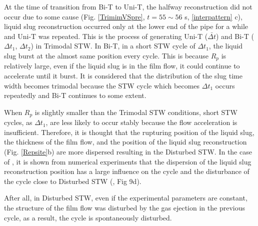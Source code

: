\documentclass[aps,pre,preprint,groupedaddress,showkeys]{revtex4-2}
\begin{document}
At the time of transition from Bi-T to Uni-T, the halfway reconstruction did not occur due to some cause (Fig. \ref{TrimimVSpre}, $ t = 55 \sim56 $ s, \ref{interpattern} c), liquid slug reconstruction occurred only at the lower end of the pipe for a while and Uni-T was repeated.
This is the process of generating Uni-T ($ \bar{\Delta t} $) and Bi-T ($ \Delta t_ {1} $, $ \Delta t_ {2} $) in Trimodal STW.
In Bi-T, in a short STW cycle of $ \Delta t_ {1} $, the liquid slug burst at the almost same position every cycle.
This is because $ R_p $ is relatively large, even if the liquid slug is in the film flow, it could continue to accelerate until it burst.
It is considered that the distribution of the slug time width becomes trimodal because the STW cycle which becomes $ \Delta t_ {1} $ occurs repeatedly and Bi-T continues to some extent.

When $ R_p $ is slightly smaller than the Trimodal STW conditions, short STW cycles, as $ \Delta t_ {1} $, are less likely to occur stably because the flow acceleration is insufficient.
Therefore, it is thought that the rupturing position of the liquid slug, the thickness of the film flow, and the position of the liquid slug reconstruction (Fig. \ref{Repsite}b) are more dispersed resulting in the Disturbed STW.
In the case of \cite{kanno2018}, it is shown from numerical experiments that the dispersion of the liquid slug reconstruction position has a large influence on the cycle and the disturbance of the cycle close to Disturbed STW (\cite{kanno2018}, Fig 9d).

After all, in Disturbed STW, even if the experimental parameters are constant, the structure of the film flow was disturbed by the gas ejection in the previous cycle, as a result, the cycle is spontaneously disturbed.
\end{document}
